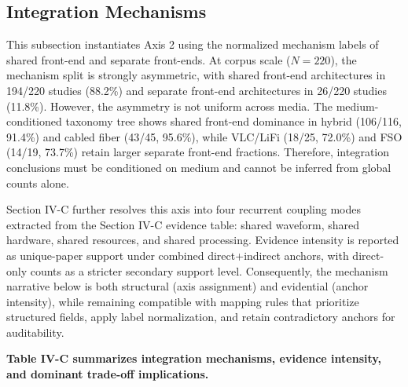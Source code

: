 \subsection{Integration Mechanisms}
This subsection instantiates Axis 2 using the normalized mechanism labels of shared front-end and separate front-ends. At corpus scale ($N=220$), the mechanism split is strongly asymmetric, with shared front-end architectures in 194/220 studies (88.2\%) and separate front-end architectures in 26/220 studies (11.8\%). However, the asymmetry is not uniform across media. The medium-conditioned taxonomy tree shows shared front-end dominance in hybrid (106/116, 91.4\%) and cabled fiber (43/45, 95.6\%), while VLC/LiFi (18/25, 72.0\%) and FSO (14/19, 73.7\%) retain larger separate front-end fractions. Therefore, integration conclusions must be conditioned on medium and cannot be inferred from global counts alone.

Section IV-C further resolves this axis into four recurrent coupling modes extracted from the Section IV-C evidence table: shared waveform, shared hardware, shared resources, and shared processing. Evidence intensity is reported as unique-paper support under combined direct+indirect anchors, with direct-only counts as a stricter secondary support level. Consequently, the mechanism narrative below is both structural (axis assignment) and evidential (anchor intensity), while remaining compatible with mapping rules that prioritize structured fields, apply label normalization, and retain contradictory anchors for auditability.

\textbf{Table IV-C summarizes integration mechanisms, evidence intensity, and dominant trade-off implications.}

